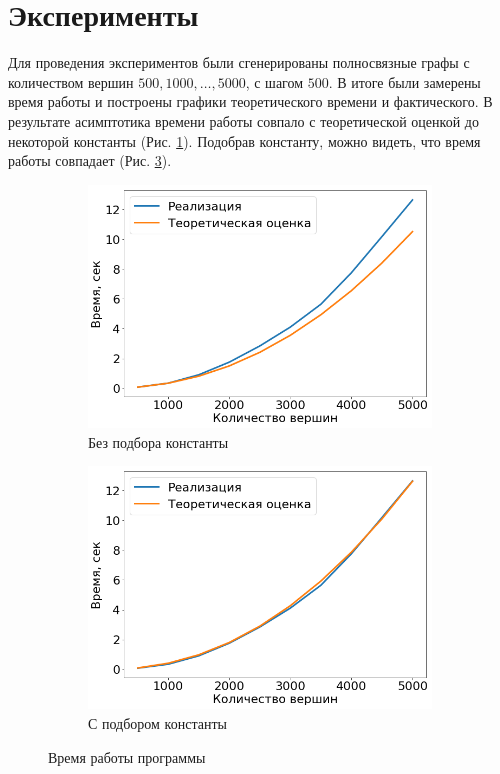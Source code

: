\documentclass[12pt, a4paper]{article}
\begin{document}
    \section{Эксперименты}
        Для проведения экспериментов были сгенерированы полносвязные графы с количеством вершин $500, 1000, \dots, 5000$, с шагом $500$. В итоге были замерены время работы и построены графики теоретического времени и фактического. В результате асимптотика времени работы совпало с теоретической оценкой до некоторой константы (Рис. \ref{fig:nonc}). Подобрав константу, можно видеть, что время работы совпадает (Рис. \ref{fig:cons}).
        \begin{figure}[h]
            \centering
            \begin{subfigure}[b]{0.49\textwidth}
                \includegraphics[width=\textwidth]{pics/plot_nconst}
                \caption{Без подбора константы}
                \label{fig:nonc}
            \end{subfigure}
            \begin{subfigure}[b]{0.49\textwidth}
                \includegraphics[width=\textwidth]{pics/plot_const}
                \caption{С подбором константы}
                \label{fig:cons}
            \end{subfigure}
            \caption{Время работы программы}
        \end{figure}
\end{document}
